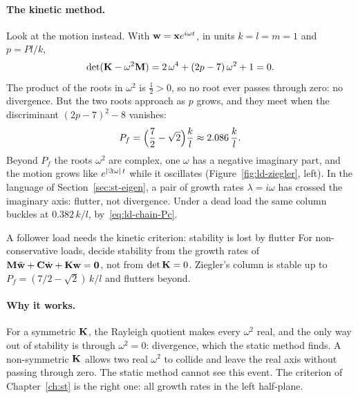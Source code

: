 \paragraph{The kinetic method.}
%
Look at the motion instead. With $\mathbf{w} = \mathbf{x}e^{i\omega t}$, in units $k = l = m = 1$
and $p = Pl/k$,
\begin{equation}\label{eq:ld-ziegler-char}
  \det(\mathbf{K} - \omega^2\mathbf{M}) = 2\,\omega^4 + (2p - 7)\,\omega^2 + 1 = 0 .
\end{equation}
The product of the roots in $\omega^2$ is $\tfrac12 > 0$, so no root ever passes through
zero: no divergence. But the two roots approach as $p$ grows, and they meet when the
discriminant $(2p - 7)^2 - 8$ vanishes:
\begin{equation}\label{eq:ld-ziegler-pf}
  P_f = \Bigl(\frac72 - \sqrt2\Bigr)\frac kl \approx 2.086\,\frac kl .
\end{equation}
Beyond $P_f$ the roots $\omega^2$ are complex, one $\omega$ has a negative imaginary
part, and the motion grows like $e^{\lvert \Im\omega\rvert\,t}$ while it oscillates
(Figure~\ref{fig:ld-ziegler}, left). In the language of Section~\ref{sec:st-eigen},
a pair of growth rates $\lambda = i\omega$ has crossed the imaginary axis: flutter,
not divergence. Under a dead load the same column buckles at $0.382\,k/l$,
by~\eqref{eq:ld-chain-Pc}.

\begin{gbox}{A follower load needs the kinetic criterion: stability is lost by flutter}\label{sec:ld-kinetic}
%
For non-conservative loads, decide stability from the growth rates of
$\mathbf{M}\ddot{\mathbf{w}} + \mathbf{C}\dot{\mathbf{w}} + \mathbf{K}\mathbf{w} = \mathbf{0}$, not from
$\det\mathbf{K} = 0$. Ziegler's column is stable up to $P_f = (7/2 - \sqrt2)\,k/l$ and
flutters beyond.
\end{gbox}

\paragraph{Why it works.}
For a symmetric $\mathbf{K}$, the Rayleigh quotient makes every $\omega^2$ real, and the
only way out of stability is through $\omega^2 = 0$: divergence, which the static
method finds. A non-symmetric $\mathbf{K}$ allows two real $\omega^2$ to collide and leave
the real axis without passing through zero. The static method cannot see this
event. The criterion of Chapter~\ref{ch:st} is the right one: all growth rates in
the left half-plane.

